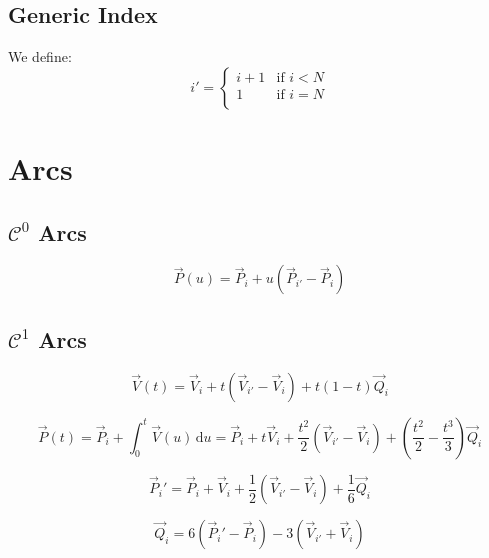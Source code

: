 \documentclass[aps,12pt]{revtex4}
\begin{document}
\subsection{Generic Index}
We define:
\begin{equation}
	i' =
	\left\lbrace
	\begin{array}{rcl}
		i+1 & \mbox{if } i<N\\
		1   & \mbox{if } i=N\\
	\end{array}
	\right.
\end{equation}


\section{Arcs}

\subsection{$\mathcal{C}^0$ Arcs}

\begin{equation}
	\vec{P}(u) = \vec{P}_i + u \left(\vec{P}_{i'} - \vec{P}_{i}\right)
\end{equation}

\subsection{$\mathcal{C}^1$ Arcs}

\begin{equation}
	\vec{V}(t) = \vec{V}_i + t \left(\vec{V}_{i'}-\vec{V}_i\right) + t(1-t) \vec{Q}_i
\end{equation}

\begin{equation}
	\vec{P}(t) = \vec{P}_i + \int_0^t \vec{V}(u) \, \mathrm{d} u 
	= \vec{P}_i + t\vec{V}_i  + \frac{t^2}{2} \left(\vec{V}_{i'}-\vec{V}_i\right) + \left(\frac{t^2}{2} - \frac{t^3}{3}\right) \vec{Q}_i
\end{equation}

\begin{equation}
	\vec{P}_i' = \vec{P}_i + \vec{V}_i  + \frac{1}{2} \left(\vec{V}_{i'}-\vec{V}_i\right) + \frac{1}{6} \vec{Q}_i
\end{equation}


\begin{equation}
	\boxed{\vec{Q}_i = 6\left(\vec{P}_i'-\vec{P}_i\right) - 3  \left(\vec{V}_{i'}+\vec{V}_i\right)}
\end{equation}
\end{document}
